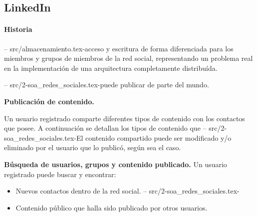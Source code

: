                          \subsection{LinkedIn}
                         \paragraph{Historia}
--
src/almacenamiento.tex-acceso y escritura de forma diferenciada para los miembros y grupos de miembros
                       de la red social, representando un problema real en la implementación de una
                       arquitectura completamente distribuída. 
                       
--
src/2-soa_redes_sociales.tex-puede publicar de parte del mundo.
                             
                                 \item \textbf{Publicación de contenido.}
                             
                             Un usuario registrado comparte diferentes tipos de contenido con
                             los contactos que posee. A continuación se detallan los tipos de contenido que
--
src/2-soa_redes_sociales.tex-El contenido compartido puede ser modificado y/o eliminado por el usuario
                             que lo publicó, según sea el caso.
                             
                                 \item \textbf{Búsqueda de usuarios, grupos y contenido publicado.}
                             Un usuario registrado puede buscar y encontrar:
                                 \begin{itemize}
                                     \item Nuevos contactos dentro de la red social.
--
src/2-soa_redes_sociales.tex-        \item Contenido público que halla sido publicado por otros usuarios.
                                 \end{itemize}
                             

